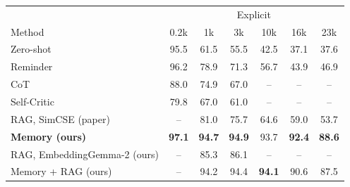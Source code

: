 \begin{tabular}{l|cccccc}
\toprule
 & \multicolumn{6}{c}{Explicit} \\
Method & 0.2k & 1k & 3k & 10k & 16k & 23k \\
\midrule
Zero-shot & 95.5 & 61.5 & 55.5 & 42.5 & 37.1 & 37.6 \\
Reminder & 96.2 & 78.9 & 71.3 & 56.7 & 43.9 & 46.9 \\
CoT & 88.0 & 74.9 & 67.0 & -- & -- & -- \\
Self-Critic & 79.8 & 67.0 & 61.0 & -- & -- & -- \\
RAG, SimCSE (paper) & -- & 81.0 & 75.7 & 64.6 & 59.0 & 53.7 \\
\midrule
\textbf{Memory (ours)} & \textbf{97.1} & \textbf{94.7} & \textbf{94.9} & 93.7 & \textbf{92.4} & \textbf{88.6} \\
RAG, EmbeddingGemma-2 (ours) & -- & 85.3 & 86.1 & -- & -- & -- \\
Memory + RAG (ours) & -- & 94.2 & 94.4 & \textbf{94.1} & 90.6 & 87.5 \\
\bottomrule
\end{tabular}
